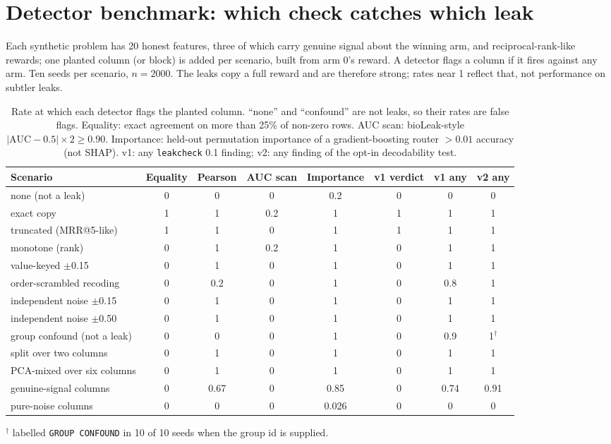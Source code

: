 \documentclass{article}
\begin{document}
\section{Detector benchmark: which check catches which leak}
\label{sup:bench}
Each synthetic problem has 20 honest features, three of which carry genuine signal about the
winning arm, and reciprocal-rank-like rewards; one planted column (or block) is added per scenario,
built from arm 0's reward. A detector flags a column if it fires against any arm. Ten seeds per
scenario, $n{=}2000$. The leaks copy a full reward and are therefore strong; rates near 1 reflect
that, not performance on subtler leaks.

\begin{table}[h]
\centering
\small
\caption{Rate at which each detector flags the planted column. ``none'' and ``confound'' are not
leaks, so their rates are false flags. Equality: exact agreement on more than 25\% of non-zero
rows. AUC scan: bioLeak-style $|\mathrm{AUC}-0.5|\times 2 \ge 0.90$. Importance: held-out
permutation importance of a gradient-boosting router $>0.01$ accuracy (not SHAP). v1: any
\texttt{leakcheck} 0.1 finding; v2: any finding of the opt-in decodability test.}
\label{tab:bench}
\begin{tabular}{lccccccc}
\toprule
Scenario & Equality & Pearson & AUC scan & Importance & v1 verdict & v1 any & v2 any \\
\midrule
none (not a leak)          & 0 & 0   & 0   & 0.2 & 0 & 0   & 0 \\
exact copy                 & 1 & 1   & 0.2 & 1   & 1 & 1   & 1 \\
truncated (MRR@5-like)     & 1 & 1   & 0   & 1   & 1 & 1   & 1 \\
monotone (rank)            & 0 & 1   & 0.2 & 1   & 0 & 1   & 1 \\
value-keyed $\pm$0.15      & 0 & 1   & 0   & 1   & 0 & 1   & 1 \\
order-scrambled recoding   & 0 & 0.2 & 0   & 1   & 0 & 0.8 & 1 \\
independent noise $\pm$0.15 & 0 & 1  & 0   & 1   & 0 & 1   & 1 \\
independent noise $\pm$0.50 & 0 & 1  & 0   & 1   & 0 & 1   & 1 \\
group confound (not a leak) & 0 & 0  & 0   & 1   & 0 & 0.9 & 1$^\dagger$ \\
split over two columns     & 0 & 1   & 0   & 1   & 0 & 1   & 1 \\
PCA-mixed over six columns & 0 & 1   & 0   & 1   & 0 & 1   & 1 \\
\midrule
genuine-signal columns     & 0 & 0.67 & 0  & 0.85 & 0 & 0.74 & 0.91 \\
pure-noise columns         & 0 & 0    & 0  & 0.026 & 0 & 0   & 0 \\
\bottomrule
\end{tabular}

{\footnotesize $^\dagger$ labelled \texttt{GROUP CONFOUND} in 10 of 10 seeds when the group id is supplied.}
\end{table}
\end{document}
